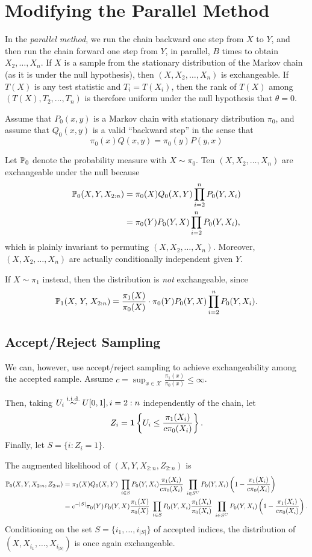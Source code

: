\documentclass{article}
\theoremstyle{definition}
\newcommand{\cX}{\mathcal{X}}
\begin{document}
\section{Modifying the Parallel Method}\label{sec:parallel}

In the {\em parallel method}, we run the chain backward one step from $X$ to $Y$, and then run the chain forward one step from $Y$, in parallel, $B$ times to obtain $X_2,\ldots, X_n$. If $X$ is a sample from the stationary distribution of the Markov chain (as it is under the null hypothesis), then $(X,X_2,\ldots,X_n)$ is exchangeable. If $T(X)$ is any test statistic and $T_i=T(X_i)$, then the rank of $T(X)$ among $(T(X), T_2, \ldots, T_n)$  is therefore uniform under the null hypothesis that $\theta=0$.

Assume that $P_0(x,y)$ is a Markov chain with stationary distribution $\pi_0$, and assume that $Q_0(x,y)$ is a valid ``backward step'' in the sense that 
\[
\pi_0(x)Q(x,y) = \pi_0(y)P(y,x)
\]

Let $\P_0$ denote the probability measure with $X\sim \pi_0$. Ten  $(X,X_2,\ldots,X_n)$ are exchangeable under the null because
\begin{align}
  \P_0(X,Y,X_{2:n})
  &= \pi_0(X)Q_0(X,Y) \prod_{i=2}^n P_0(Y,X_i)\\
  &= \pi_0(Y)P_0(Y,X) \prod_{i=2}^n P_0(Y,X_i),
\end{align}
which is plainly invariant to permuting $(X,X_2,\ldots,X_n)$. Moreover, $(X,X_2,\ldots,X_n)$ are actually conditionally independent given $Y$.

If $X\sim \pi_1$ instead, then the distribution is {\em not} exchangeable, since
\[
  \P_1(X, \,Y, \,X_{2:n})
  = \frac{\pi_1(X)}{\pi_0(X)} \cdot \pi_0(Y)P_0(Y,X) \prod_{i=2}^n P_0(Y,X_i).
\]

\subsection{Accept/Reject Sampling}

We can, however, use accept/reject sampling to achieve exchangeability among the accepted sample. Assume $c=\sup_{x\in\cX} \frac{\pi_1(x)}{\pi_0(x)} \leq \infty$.

Then, taking $U_i \simiid U[0,1], i=2:n$ independently of the chain, let
\[
Z_i = \1\left\{U_i \leq \frac{\pi_1(X_i)}{c\pi_0(X_i)}\right\}.
\]
Finally, let $S=\{i: Z_i = 1\}$.

The augmented likelihood of $(X,Y,X_{2:n}, Z_{2:n})$ is
\begin{align}
  \P_0(X,Y,X_{2:n},Z_{2:n}) 
  &= \pi_1(X)Q_0(X,Y) \;\prod_{i\in S} P_0(Y,X_i)\frac{\pi_1(X_i)}{c\pi_0(X_i)}
  \; \prod_{i\in S^C} P_0(Y,X_i)\left(1-\frac{\pi_1(X_i)}{c\pi_0(X_i)}\right)\\
  &= c^{-|S|}\pi_0(Y)P_0(Y,X)\frac{\pi_1(X)}{\pi_0(X)} \;\prod_{i\in S} P_0(Y,X_i)\frac{\pi_1(X_i)}{\pi_0(X_i)}
  \; \prod_{i\in S^C} P_0(Y,X_i)\left(1-\frac{\pi_1(X_i)}{c\pi_0(X_i)}\right).
\end{align}
Conditioning on the set $S=\{i_1,\ldots,i_{|S|}\}$ of accepted indices, the distribution of $(X, X_{i_1},\ldots,X_{i_{|S|}})$ is once again exchangeable.
\end{document}
